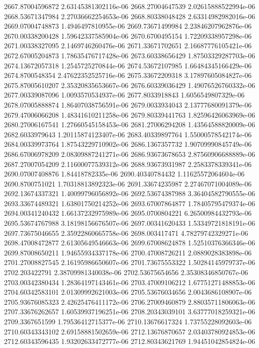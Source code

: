 {2667.87004596872 2.63145381302116e-06
2668.27004647539 2.02615888522994e-06
2668.53671347984 2.27036662254653e-06
2668.80338048428 2.63314982982016e-06
2669.07004748873 1.4946497810955e-06
2669.73671499984 2.23846207962876e-06
2670.00338200428 1.59642337585904e-06
2670.6700495154 1.72209338957298e-06
2671.00338327095 2.1469746260476e-06
2671.33671702651 2.16687776105421e-06
2672.67005204873 1.78635476717428e-06
2673.60338656429 1.87503329287703e-06
2674.13672057318 1.2545725270844e-06
2674.53672107985 1.66484345166429e-06
2674.8700548354 2.47622352525716e-06
2675.33672209318 3.17897605084827e-06
2675.87005610207 2.35320835653667e-06
2676.60339036429 1.49076526760332e-06
2677.00339087096 1.0093570534937e-06
2677.8033918843 1.6056549807329e-06
2678.07005888874 1.86407038756591e-06
2679.0033934043 2.13777680091379e-06
2679.47006066208 1.48341610211258e-06
2679.80339441763 1.82596426063969e-06
2680.27006167541 1.27660545158453e-06
2681.27006294208 1.43564588820009e-06
2682.6033979643 1.20115874123407e-06
2683.40339897764 1.55000578542174e-06
2684.00339973764 1.87543229710902e-06
2686.1367357732 1.90709990845749e-06
2686.67006978209 2.08309887241271e-06
2686.93673678653 2.87560906688889e-06
2687.27007054209 2.11600077539312e-06
2688.93673931987 2.2583378339341e-06
2690.07007408876 1.84418782335e-06
2690.40340784432 1.11625572064604e-06
2690.8700751021 1.70318813892323e-06
2691.33674235987 2.27467071004089e-06
2692.13674337321 1.40099796056892e-06
2692.53674387988 3.36404582790555e-06
2693.33674489321 1.63801750214252e-06
2693.67007864877 1.78405795479374e-06
2694.00341240432 1.66137232975989e-06
2695.0700804221 6.26500984432793e-06
2695.53674767988 3.18198156676507e-06
2697.00341620433 1.53349721818191e-06
2697.73675046655 2.35922860665758e-06
2698.003417471 4.78279742329271e-06
2698.47008472877 2.61305649546663e-06
2699.67008624878 1.52510376366346e-06
2699.87008650211 1.94655934337178e-06
2700.47008726211 2.0889028383898e-06
2701.27008827545 2.16195986650607e-06
2701.73675553322 1.50284145979737e-06
2702.203422791 2.38709981340038e-06
2702.53675654656 2.35308346850767e-06
2703.00342380434 1.28364197143461e-06
2703.47009106212 1.67751271488853e-06
2704.60342583101 2.01309992621003e-06
2705.53676034656 2.0043686108907e-06
2705.93676085323 2.42625476411172e-06
2706.27009460879 2.88035711806063e-06
2707.33676262657 1.60539937196251e-06
2708.20343039101 3.63777018259321e-06
2709.3367651599 1.79536412715377e-06
2710.13676617324 1.73755228092603e-06
2710.60343343102 2.69158881502659e-06
2712.13676870657 2.03403780924853e-06
2712.60343596435 1.93202633472777e-06
2712.80343621769 1.94451042854824e-06
}
